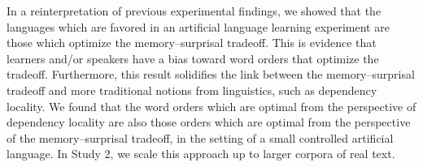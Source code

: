 In a reinterpretation of previous experimental findings, we showed that the languages which are favored in an artificial language learning experiment are those which optimize the memory--surprisal tradeoff.
This is evidence that learners and/or speakers have a bias toward word orders that optimize the tradeoff. 
Furthermore, this result solidifies the link between the memory--surprisal tradeoff and more traditional notions from linguistics, such as dependency locality. 
We found that the word orders which are optimal from the perspective of dependency locality are also those orders which are optimal from the perspective of the memory--surprisal tradeoff, in the setting of a small controlled artificial language.
In Study 2, we scale this approach up to larger corpora of real text.